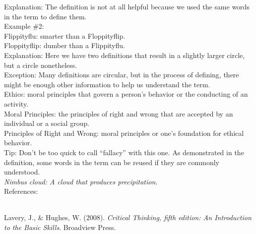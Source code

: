 \documentclass[a4paper,12pt,single,pdftex]{scrartcl}
\begin{document}
    
      Explanation: The definition is not at all helpful because we used the same words in the term to define them.
    \\

    
      Example \#2:
    \\

    
      Flippityflu: smarter than a Floppityflip.
    \\

    
      Floppityflip: dumber than a Flippityflu.
    \\

    
      Explanation: Here we have two definitions that result in a slightly larger circle, but a circle nonetheless.
    \\

    
      Exception: Many definitions are circular, but in the process of defining, there might be enough other information to help us understand the term.
    \\

    
      Ethics: moral principles that govern a person's behavior or the conducting of an activity.
    \\

    
      Moral Principles: the principles of right and wrong that are accepted by an individual or a social group.
    \\

    
      Principles of Right and Wrong: moral principles or one's foundation for ethical behavior.
    \\

    
      Tip: Don’t be too quick to call “fallacy” with this one. As demonstrated in the definition, some words in the term can be reused if they are commonly understood.
    \\

    
      {\em Nimbus cloud: A cloud that produces precipitation.}
    \\

    References:

    
      
        
      \\

      
        
          Lavery, J., \& Hughes, W. (2008). {\it Critical Thinking, fifth edition: An Introduction to the Basic Skills}. Broadview Press.
        
      
    
  
\end{document}

